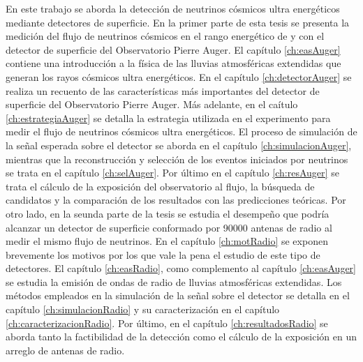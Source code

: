 En este trabajo se aborda la detecci\'on de neutrinos c\'osmicos ultra energ\'eticos mediante detectores de superficie.
En la primer parte de esta tesis se presenta la medici\'on del flujo de neutrinos c\'osmicos en el rango energ\'etico de  y  con el detector de superficie del Observatorio Pierre Auger.
El cap\'itulo \ref{ch:easAuger} contiene una introducci\'on a la f\'isica de las lluvias atmosf\'ericas extendidas que generan los rayos c\'osmicos ultra energ\'eticos. 
En el cap\'itulo \ref{ch:detectorAuger} se realiza un recuento de las caracter\'isticas m\'as importantes del detector de superficie del Observatorio Pierre Auger.
M\'as adelante, en el ca\'itulo \ref{ch:estrategiaAuger} se detalla la estrategia utilizada en el experimento para medir el flujo de neutrinos c\'osmicos ultra energ\'eticos.
El proceso de simulaci\'on de la se\~nal esperada sobre el detector se aborda en el cap\'itulo \ref{ch:simulacionAuger}, mientras que la reconstrucci\'on y selecci\'on de los eventos iniciados por neutrinos se trata en el cap\'itulo \ref{ch:selAuger}.
Por \'ultimo en el cap\'itulo \ref{ch:resAuger} se trata el c\'alculo de la exposici\'on del observatorio al flujo, la b\'usqueda de candidatos y la comparaci\'on de los resultados con las predicciones te\'oricas.
Por otro lado, en la seunda parte de la tesis se estudia el desempe\~no que podr\'ia alcanzar un detector de superficie conformado por 90000 antenas de radio al medir el mismo flujo de neutrinos.
En el cap\'itulo \ref{ch:motRadio} se exponen brevemente los motivos por los que vale la pena el estudio de este tipo de detectores.
El cap\'itulo \ref{ch:easRadio}, como complemento al cap\'itulo \ref{ch:easAuger} se estudia la emisi\'on de ondas de radio de lluvias atmosf\'ericas extendidas.
Los m\'etodos empleados en la simulaci\'on de la se\~nal sobre el detector se detalla en el cap\'itulo \ref{ch:simulacionRadio} y su caracterizaci\'on en el cap\'itulo \ref{ch:caracterizacionRadio}.
Por \'ultimo, en el cap\'itulo \ref{ch:resultadosRadio} se aborda tanto la factibilidad de la detecci\'on como el c\'alculo de la exposici\'on en un arreglo de antenas de radio.

